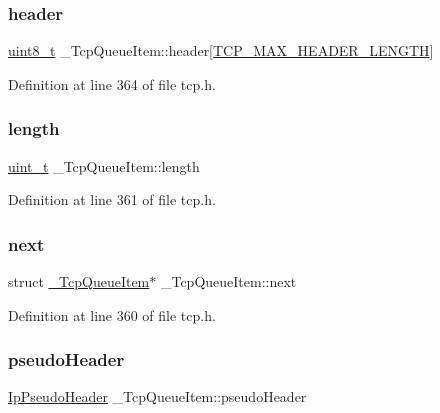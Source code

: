 \subsubsection{\texorpdfstring{header}{header}}
{\footnotesize\ttfamily \hyperlink{stdint_8h_aba7bc1797add20fe3efdf37ced1182c5}{uint8\+\_\+t} \+\_\+\+Tcp\+Queue\+Item\+::header\mbox{[}\hyperlink{tcp_8h_a296869e905bda7013716794027a5b07c}{T\+C\+P\+\_\+\+M\+A\+X\+\_\+\+H\+E\+A\+D\+E\+R\+\_\+\+L\+E\+N\+G\+TH}\mbox{]}}



Definition at line 364 of file tcp.\+h.

\mbox{\label{struct__TcpQueueItem_a3c42cb4d2046a392570ab6f8dfa7a398}} 
\subsubsection{\texorpdfstring{length}{length}}
{\footnotesize\ttfamily \hyperlink{compiler__port_8h_a12a1e9b3ce141648783a82445d02b58d}{uint\+\_\+t} \+\_\+\+Tcp\+Queue\+Item\+::length}



Definition at line 361 of file tcp.\+h.

\mbox{\label{struct__TcpQueueItem_a5e46d57271b1dcbf0a5d647ca67f2a86}} 
\subsubsection{\texorpdfstring{next}{next}}
{\footnotesize\ttfamily struct \hyperlink{struct__TcpQueueItem}{\+\_\+\+Tcp\+Queue\+Item}$\ast$ \+\_\+\+Tcp\+Queue\+Item\+::next}



Definition at line 360 of file tcp.\+h.

\mbox{\label{struct__TcpQueueItem_a2ddf7abb88b02f243eae7461ced90ef0}} 
\subsubsection{\texorpdfstring{pseudo\+Header}{pseudoHeader}}
{\footnotesize\ttfamily \hyperlink{structIpPseudoHeader}{Ip\+Pseudo\+Header} \+\_\+\+Tcp\+Queue\+Item\+::pseudo\+Header}




